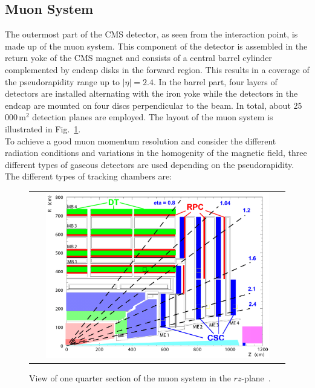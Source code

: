 \subsection{Muon System}
\label{subsec:cms_muon}
The outermost part of the CMS detector, as seen from the interaction point, is made up of the muon system. This component of the detector is assembled in the return yoke of the CMS magnet and consists of a central barrel cylinder complemented by endcap disks in the forward region. This results in a coverage of the pseudorapidity range up to $|\eta| = 2.4$. In the barrel part, four layers of detectors are installed alternating with the iron yoke while the detectors in the endcap are mounted on four discs perpendicular to the beam. In total, about 25\,000\,$\mathrm{m}^2$ detection planes are employed. The layout of the muon system is illustrated in Fig.~\ref{fig:CMS_muon}. \\
To achieve a good muon momentum resolution and consider the different radiation conditions and variations in the homogenity of the magnetic field, three different types of gaseous detectors are used depending on the pseudorapidity. The different types of tracking chambers are:
\begin{figure}[!tp]
  \centering
  \begin{tabular}{c}
    \includegraphics[width=0.9\textwidth]{figures/Figures_Experimental_Apparatus_MuonDetector.png}
  \end{tabular}
  \caption{View of one quarter section of the muon system in the $rz$-plane~\cite{bib:cmsptdr1}.}
  \label{fig:CMS_muon}
\end{figure}

